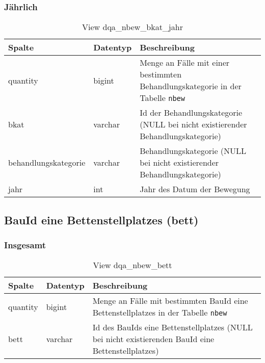\subsubsection{Jährlich} \label{subsubsec:behKatJ}

\begin{table}[ht]
	\centering   
	\caption{View dqa\_nbew\_bkat\_jahr}
	\label{tab:beweBkatJahr}
	\begin{tabular}{||l|l|p{10cm}||}   		
		\hline
		Spalte & Datentyp & Beschreibung \\ [0.5ex]
		\hline\hline
		quantity & bigint & Menge an Fälle mit einer bestimmten Behandlungskategorie in der Tabelle \texttt{nbew} \\
		\hline
		bkat & varchar & Id der Behandlungskategorie (NULL bei nicht existierender Behandlungskategorie)\\
		\hline
		behandlungskategorie & varchar & Behandlungskategorie (NULL bei nicht existierender Behandlungskategorie)\\
		\hline
		jahr & int &  Jahr des Datum der Bewegung \\
		\hline
		
	\end{tabular}
\end{table}

\subsection{BauId eine Bettenstellplatzes (bett)} \label{subsec:bett}

\subsubsection{Insgesamt} \label{subsubsec:bettI}

\begin{table}[ht]
	\centering   
	\caption{View dqa\_nbew\_bett}
	\label{tab:beweBettAll}
	\begin{tabular}{||l|l|p{10cm}||}   		
		\hline
		Spalte & Datentyp & Beschreibung \\ [0.5ex]
		\hline\hline
		quantity & bigint & Menge an Fälle mit bestimmten BauId eine Bettenstellplatzes in der Tabelle \texttt{nbew} \\
		\hline
		bett & varchar & Id des BauIds eine Bettenstellplatzes (NULL bei nicht existierenden BauId eine Bettenstellplatzes)\\
		\hline
		
	\end{tabular}
\end{table}

